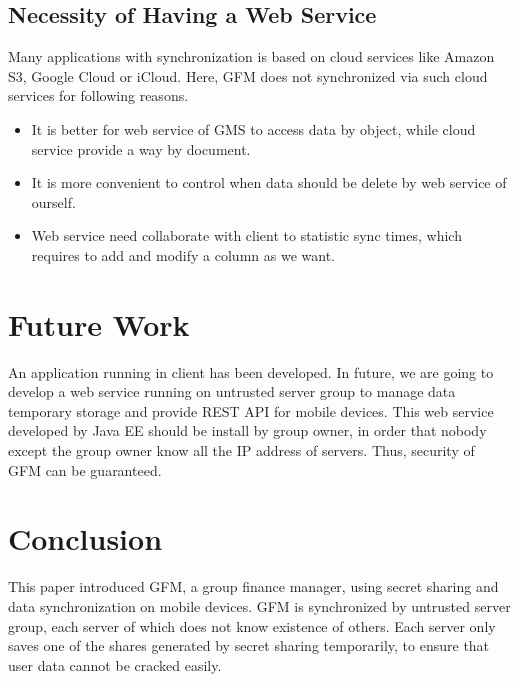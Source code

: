 \documentclass[twocolumn,10pt]{article}
\begin{document}
\subsection{Necessity of Having a Web Service}
Many applications with synchronization is based on cloud services like Amazon S3, Google Cloud or iCloud. Here, GFM does not synchronized via such cloud services for following reasons.
\begin{itemize}
\setlength{\itemsep}{1pt}
\setlength{\parskip}{0pt}
\setlength{\parsep}{0pt}
    \item It is better for web service of GMS to access data by object, while cloud service provide a way by document. 
    \item It is more convenient to control when data should be delete by web service of ourself.
    \item Web service need collaborate with client to statistic sync times, which requires to add and modify a column as we want.
\end{itemize}

\section{Future Work}

An application running in client has been developed. In future, we are going to develop a web service running on untrusted server group to manage data temporary storage and provide REST API for mobile devices. This web service developed by Java EE should be install by group owner, in order that nobody except the group owner know all the IP address of servers. Thus, security of GFM can be guaranteed.

\section{Conclusion}

This paper introduced GFM, a group finance manager, using secret sharing and data synchronization on mobile devices. GFM is synchronized by untrusted server group, each server of which does not know existence of others. Each server only saves one of the shares generated by secret sharing temporarily, to ensure that user data cannot be cracked easily.

{\tiny
\printbibliography
}
\end{document}
